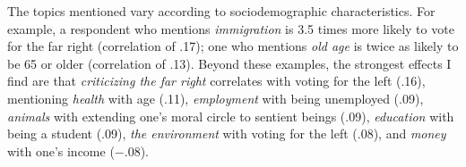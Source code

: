 \documentclass[12pt,english]{article}
\begin{document}
\begin{bibunit}
The topics mentioned vary according to sociodemographic characteristics. For example, a respondent who mentions \textit{immigration} is 3.5 times more likely to vote for the far right (correlation of .17); one who mentions \textit{old age} is twice as likely to be 65 or older (correlation of .13). Beyond these examples, the strongest effects I find are that \textit{criticizing the far right} correlates with voting for the left (.16), mentioning \textit{health} with age (.11), \textit{employment} with being unemployed (.09), \textit{animals} with extending one's moral circle to sentient beings (.09), \textit{education} with being a student (.09), \textit{the environment} with voting for the left (.08), and \textit{money} with one's income ($-$.08).


\end{bibunit}
\end{document}
